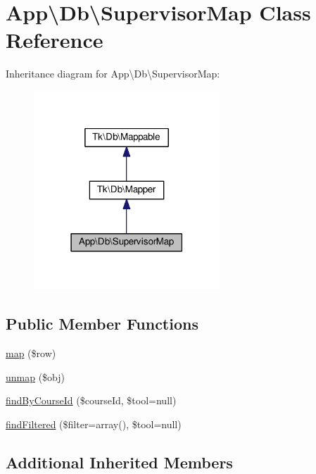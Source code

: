 \hypertarget{classApp_1_1Db_1_1SupervisorMap}{\section{App\textbackslash{}Db\textbackslash{}Supervisor\+Map Class Reference}
\label{classApp_1_1Db_1_1SupervisorMap}
}


Inheritance diagram for App\textbackslash{}Db\textbackslash{}Supervisor\+Map\+:\nopagebreak
\begin{figure}[H]
\begin{center}
\leavevmode
\includegraphics[width=198pt]{classApp_1_1Db_1_1SupervisorMap__inherit__graph}
\end{center}
\end{figure}
\subsection*{Public Member Functions}
\begin{DoxyCompactItemize}
\item 
\hyperlink{classApp_1_1Db_1_1SupervisorMap_a1c8a63c9f5cb3add3d693fa1be8d3646}{map} (\$row)
\item 
\hyperlink{classApp_1_1Db_1_1SupervisorMap_a4ff3ad6ce5f2da3236ca6e6e6df6dbc6}{unmap} (\$obj)
\item 
\hyperlink{classApp_1_1Db_1_1SupervisorMap_a67c005ff87b174cc16740960806d0d74}{find\+By\+Course\+Id} (\$course\+Id, \$tool=null)
\item 
\hyperlink{classApp_1_1Db_1_1SupervisorMap_adcf3b80a093c93fe5296326eaf76957a}{find\+Filtered} (\$filter=array(), \$tool=null)
\end{DoxyCompactItemize}
\subsection*{Additional Inherited Members}


